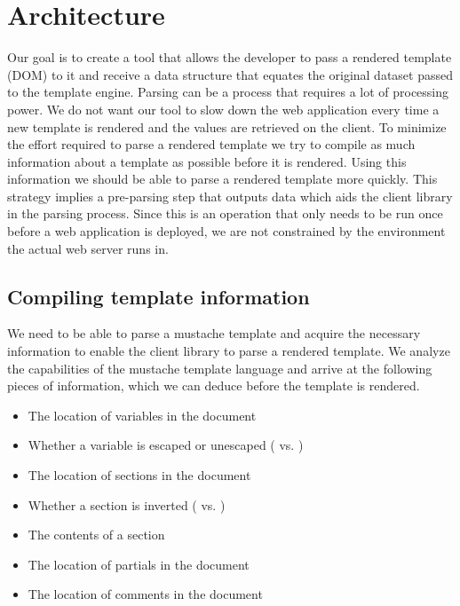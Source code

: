 \documentclass[thesis.tex]{subfiles}
\begin{document}
\chapter{Architecture}
\label{chap:architecture}

Our goal is to create a tool that allows the developer to pass a rendered
template (DOM) to it and receive a data structure that equates the original
dataset passed to the template engine.
Parsing can be a process that requires a lot of processing power. We do not want
our tool to slow down the web application every time a new template is rendered
and the values are retrieved on the client. To minimize the effort required to
parse a rendered template we try to compile as much information about a template
as possible before it is rendered. Using this information we should be able
to parse a rendered template more quickly.
This strategy implies a pre-parsing step that outputs data which aids
the client library in the parsing process. Since this is an operation
that only needs to be run once before a web application is deployed, we are not
constrained by the environment the actual web server runs in.

\section{Compiling template information}
\label{sec:arch-comp-tpl}
We need to be able to parse a mustache template and acquire the necessary
information to enable the client library to parse a rendered template.
We analyze the capabilities of the mustache template language and arrive
at the following pieces of information, which we can deduce before
the template is rendered.

\begin{itemize}
\item The location of variables in the document
\item Whether a variable is escaped or unescaped
	( vs. )
\item The location of sections in the document
\item Whether a section is inverted
	( vs. )
\item The contents of a section
\item The location of partials in the document
\item The location of comments in the document
\end{itemize}
\end{document}
